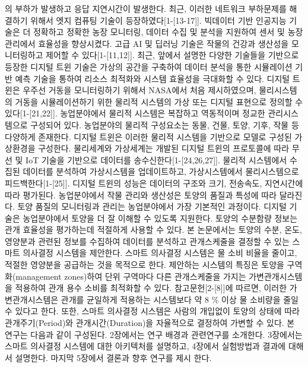 \documentclass[11pt]{article}
\begin{document}
의 부하가 발생하고 응답 지연시간이 발생한다. 최근, 이러한 네트워크 부하문제를 해결하기 위해서 엣지 컴퓨팅 기술이 등장하였다[1-[13-17]]. 빅데이터 기반 인공지능 기술은 더 정확하고 정확한 농장 모니터링, 데이터 수집 및 분석을 지원하여 센서 및 농장 관리에서 효율성을 향상시켰다. 고급 AI 및 딥러닝 기술은 작물의 건강과 생산성을 모니터링하고 제어할 수 있다[1-[11,12]]. 최근, 앞에서 설명한 다양한 기술들을 기반으로 등장한 디지털 트윈 기술은 가상의 공간을 구축하여 데이터 분석을 통한 시뮬레이션 기반 예측 기술을 통하여 리소스 최적화와 시스템 효율성을 극대화할 수 있다. 디지털 트윈은 우주선 거동을 모니터링하기 위해서 NASA에서 처음 제시하였으며, 물리시스템의 거동을 시뮬레이션하기 위한 물리적 시스템의 가상 또는 디지털 표현으로 정의할 수 있다[1-[21,22]]. 농업분야에서 물리적 시스템은 복잡하고 역동적이며 정교한 관리시스템으로 구성되어 있다. 농업분야의 물리적 구성요소는 동물, 건물, 토양, 기후, 작물 등 다양하게 존재한다. 디지털 트윈은 이러한 물리적 시스템을 기반으로 모델로 구성된 가상환경을 구성한다. 물리세계와 가상세계는 개발된 디지털 트윈의 프로토콜에 따라 무선 및 IoT 기술을 기반으로 데이터를 송수신한다[1-[24,26,27]]. 물리적 시스템에서 수집된 데이터를 분석하여 가상시스템을 업데이트하고, 가상시스템에서 물리시스템으로 피드백한다[1-[25]]. 디지털 트윈의 성능은 데이터의 구조와 크기, 전송속도, 지연시간에 따라 평가된다. 농업분야에서 작물 관리와 생산성은 토양의 품질과 특성에 따라 달라진다. 토양 품질의 모니터링과 관리는 농업분야에서 가장 기본적인 과정이다. 디지털 기술은 농업분야에서 토양을 더 잘 이해할 수 있도록 지원한다. 토양의 수분함량 정보는 관개 효율성을 평가하는데 적절하게 사용할 수 있다. 본 논문에서는 토양의 수분, 온도, 영양분과 관련된 정보를 수집하여 데이터를 분석하고 관개스케줄을 결정할 수 있는 스마트 의사결정 시스템을 제안한다. 스마트 의사결정 시스템은 물 소비 비율을 줄이고, 적절한 영양분을 공급하는 것을 목적으로 한다. 제안하는 시스템의 특징은 토양을 구역화(management zones)하여 단위 구역마다 다른 관개스케줄을 가지는 가변관개시스템을 적용하여 관개 용수 소비를 최적화할 수 있다. 참고문헌[2-[8]]에 따르면, 이러한 가변관개시스템은 관개를 균일하게 적용하는 시스템보다 약 8 \% 이상 물 소비량을 줄일 수 있다고 한다. 또한, 스마트 의사결정 시스템은 사람의 개입없이 토양의 상태에 따라 관개주기(Period)와 관개시간(Duration)을 자율적으로 결정하여 가변할 수 있다. 본 연구는 다음과 같이 구성된다. 2장에서는 연구 배경과 관련연구를 소개한다. 3장에서는 스마트 의사결정 시스템에 대한 아키텍처를 설명하고, 4장에서 실험방법과 결과에 대해서 설명한다. 마지막 5장에서 결론과 향후 연구를 제시
한다.
\end{document}
